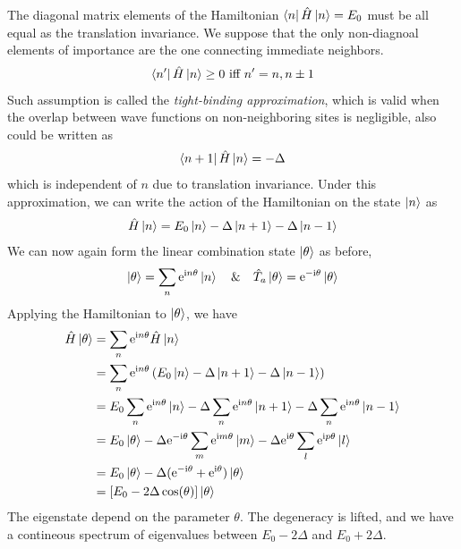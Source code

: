 The diagonal matrix elements of the Hamiltonian $\bra{n} \hat{H} \ket{n} = E_0$ must be all equal as the translation invariance. 
We suppose that the only non-diagnoal elements of importance are the one connecting immediate neighbors.
\begin{align}
    \bra{n'} \hat{H} \ket{n} \geq 0 \text{ iff } n'=n, n \pm 1
\end{align}
Such assumption is called the \emph{tight-binding approximation}, which is valid when the overlap between wave functions on non-neighboring sites is negligible, also could be written as 
\begin{align}
    \bra{n+1} \hat{H} \ket{n} = - \Delta
\end{align}
which is independent of $n$ due to translation invariance. Under this approximation, we can write the action of the Hamiltonian on the state $\ket{n}$ as
\begin{align}
    \hat{H} \ket n = E_0 \ket n - \Delta \ket {n+1} - \Delta \ket {n-1}
\end{align}
We can now again form the linear combination state $\ket \theta$ as before, 
\begin{align}
    \ket{\theta} = \sum_n \mathrm{e}^{\mathrm{i} n \theta} \ket n \quad \& \quad \hat{T}_a \ket{\theta} = \mathrm{e}^{- \mathrm{i} \theta} \ket{\theta}
\end{align}
Applying the Hamiltonian to $\ket \theta$, we have
\begin{align}
    \hat{H} \ket \theta &= \sum_n \mathrm{e}^{\mathrm{i} n \theta} \hat{H} \ket n \notag \\
    &= \sum_n \mathrm{e}^{\mathrm{i} n \theta} \left( E_0 \ket n - \Delta \ket {n+1} - \Delta \ket {n-1} \right) \notag \\
    &= E_0 \sum_n \mathrm{e}^{\mathrm{i} n \theta} \ket n - \Delta \sum_n \mathrm{e}^{\mathrm{i} n \theta} \ket {n+1} - \Delta \sum_n \mathrm{e}^{\mathrm{i} n \theta} \ket {n-1} \notag \\
    &= E_0 \ket{\theta} - \Delta \mathrm{e}^{- \mathrm{i} \theta} \sum_m \mathrm{e}^{\mathrm{i} m \theta} \ket m - \Delta \mathrm{e}^{\mathrm{i} \theta} \sum_l \mathrm{e}^{\mathrm{i} p \theta} \ket l \notag \\
    &= E_0 \ket{\theta} - \Delta (\mathrm{e}^{- \mathrm{i} \theta} + \mathrm{e}^{\mathrm{i} \theta}) \ket{\theta} \\ 
    &= \left[ E_0 - 2 \Delta \cos(\theta) \right] \ket{\theta}
\end{align}
The eigenstate depend on the parameter $\theta$. The degeneracy is lifted, and we have a contineous spectrum of eigenvalues between $E_0 - 2 \Delta$ and $E_0 + 2 \Delta$. 

